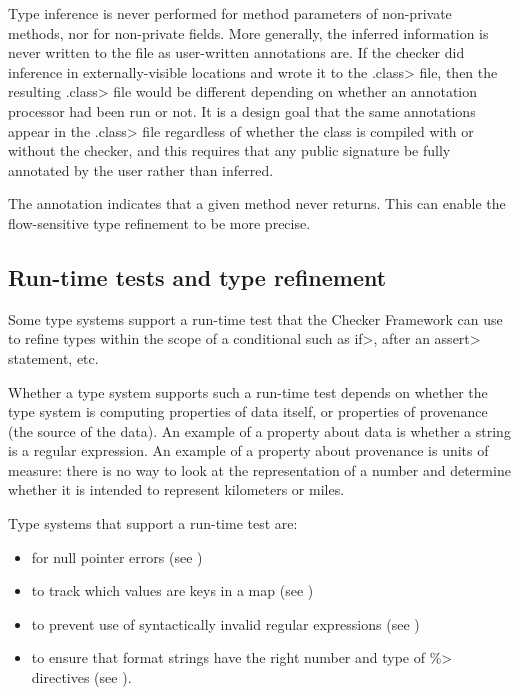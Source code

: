 
Type inference is never performed for method parameters of non-private
methods, nor for non-private fields.  
More generally, the inferred information is never written to the
 file as user-written annotations are.
If the checker did inference in externally-visible locations and wrote it
to the \<.class> file, then the resulting \<.class> file would be different
depending on whether an annotation processor had been run or not.  It is a
design goal that the same annotations appear in the \<.class> file
regardless of whether the class is compiled with or without the checker,
and this requires that any public signature be fully annotated by the user
rather than inferred.


The  annotation
indicates that a given method never returns.  This can enable the 
flow-sensitive type refinement to be more precise.


\subsection{Run-time tests and type refinement\label{type-refinement-runtime-tests}}

Some type systems support a run-time test that the Checker Framework can
use to refine types within the scope of a conditional such as \<if>, after
an \<assert> statement, etc.

Whether a type system supports such a run-time test depends on whether the
type system is computing properties of data itself, or properties of
provenance (the source of the data).  An example of a property about data is
whether a string is a regular expression.  An example of a property about
provenance is units of measure:  there is no way to look at the
representation of a number and determine whether it is intended to
represent kilometers or miles.


Type systems that support a run-time test are:
\begin{itemize}
\item
   for null pointer errors
  (see )
\item
   to track which values are
  keys in a map (see )
\item
   to prevent use of syntactically
  invalid regular expressions (see )
\item
   to ensure that format
  strings have the right number and type of \<\%> directives (see
  ).

\end{itemize}


